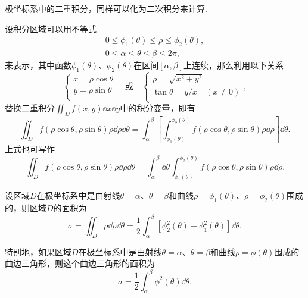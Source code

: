 极坐标系中的二重积分，同样可以化为二次积分来计算.
\begin{theorem}
设积分区域可以用不等式\begin{gather*}
0 \leq \phi_1(\theta) \leq \rho \leq \phi_2(\theta), \\
0 \leq \alpha \leq \theta \leq \beta \leq 2\pi,
\end{gather*}来表示，其中函数\(\phi_1(\theta)\)、\(\phi_2(\theta)\)在区间\([\alpha,\beta]\)上连续，那么利用以下关系\begin{equation*}
\left\{ \begin{array}{l}
x = \rho\cos\theta \\
y = \rho\sin\theta \\
\end{array} \right.
\quad\text{或}\quad
\left\{ \begin{array}{l}
\rho = \sqrt{x^2+y^2} \\
\tan\theta = y/x \quad (x \neq 0) \\
\end{array} \right.,
\end{equation*}替换二重积分\(\iint_{D}{f(x,y)\dd{x}\dd{y}}\)中的积分变量，即有
\begin{equation}
\iint_D f(\rho\cos\theta,\rho\sin\theta) \rho \dd{\rho} \dd{\theta}
=\int_\alpha^\beta \left[
	\int_{\phi_1(\theta)}^{\phi_2(\theta)}
		f(\rho\cos\theta,\rho\sin\theta) \rho \dd{\rho} \right] \dd{\theta}.
\end{equation}
上式也可写作
\begin{equation}
\iint_D f(\rho\cos\theta,\rho\sin\theta) \rho \dd{\rho} \dd{\theta}
=\int_\alpha^\beta \dd{\theta}
	\int_{\phi_1(\theta)}^{\phi_2(\theta)}
		f(\rho\cos\theta,\rho\sin\theta) \rho \dd{\rho}.
\end{equation}
\end{theorem}

\begin{corollary}
设区域\(D\)在极坐标系中是由射线\(\theta=\alpha\)、\(\theta=\beta\)和曲线\(\rho=\phi_1(\theta)\)、\(\rho=\phi_2(\theta)\)围成的，则区域\(D\)的面积为
\begin{equation}
\sigma = \iint_D \rho \dd{\rho} \dd{\theta}
= \frac{1}{2} \int_\alpha^\beta [\phi_2^2(\theta) - \phi_1^2(\theta)] \dd{\theta}.
\end{equation}

特别地，如果区域\(D\)在极坐标系中是由射线\(\theta=\alpha\)、\(\theta=\beta\)和曲线\(\rho=\phi(\theta)\)围成的曲边三角形，则这个曲边三角形的面积为
\begin{equation}
\sigma = \frac{1}{2} \int_\alpha^\beta \phi^2(\theta) \dd{\theta}.
\end{equation}
\end{corollary}

